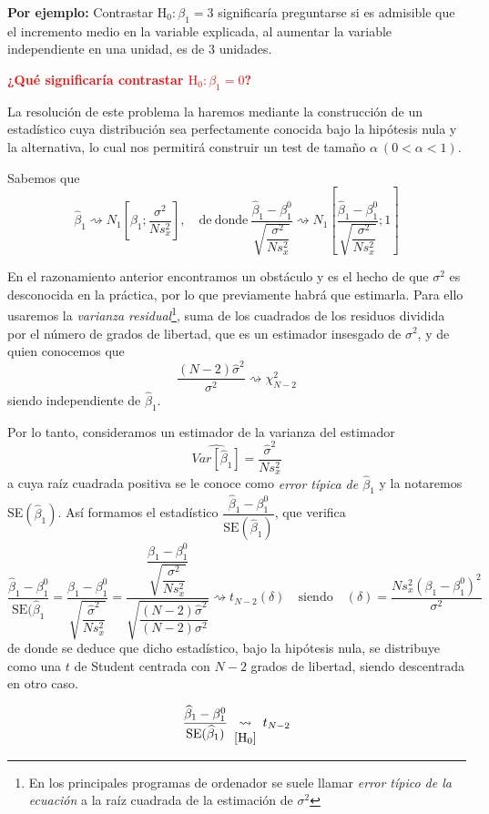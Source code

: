 \documentclass[10pt,a4paper]{book}
\begin{document}
\textbf{Por ejemplo:} Contrastar $\mathrm{H_0}:\beta_1=3$ significaría preguntarse si es admisible que el incremento medio en la variable explicada, al aumentar la variable independiente en una unidad, es de 3 unidades.

\textbf{\textcolor{red}{¿Qué significaría contrastar $\mathrm{H_0}:\beta_1=0$?}}

La resolución de este problema la haremos mediante la construcción de un estadístico cuya distribución sea perfectamente conocida bajo la hipótesis nula y la alternativa, lo cual nos permitirá construir un test de tamaño $\alpha\ (0<\alpha <1)$.

Sabemos que $$\widehat{\beta}_1\rightsquigarrow N_1 \left[\beta_1;\dfrac{\sigma^2}{Ns^2_x}\right],\quad \mathrm{de\ donde\ }\frac{\widehat{\beta}_1-\beta^0_1}{\sqrt{\dfrac{\sigma^2}{Ns^2_x}}}\rightsquigarrow N_1\left[\frac{\widehat{\beta}_1-\beta^0_1}{\sqrt{\dfrac{\sigma^2}{Ns^2_x}}};1\right]$$

En el razonamiento anterior encontramos un obstáculo y es el hecho de que $\sigma^2$ es desconocida en la práctica, por lo que previamente habrá que estimarla. Para ello usaremos la \textit{varianza residual}\footnote{ En los principales programas de ordenador se suele llamar \textit{error típico de la ecuación} a la raíz cuadrada de la estimación de $\sigma^2$}, suma de los cuadrados de los residuos dividida por el número de grados de libertad, que es un estimador insesgado de $\sigma^2$, y de quien conocemos que $$\dfrac{(N-2)\widehat{\sigma}^2}{\sigma^2}\rightsquigarrow \chi^2_{N-2}$$ siendo independiente de $\widehat{\beta}_1$.

Por lo tanto, consideramos un estimador de la varianza del estimador $$\widehat{Var[\widehat{\beta}_1]}=\dfrac{\widehat{\sigma}^2}{Ns^2_x}$$ a cuya raíz cuadrada positiva se le conoce como \textit{error típica de $\widehat{\beta}_1$} y la notaremos SE$(\widehat{\beta}_1)$. Así formamos el estadístico $\dfrac{\widehat{\beta}_1-\beta^0_1}{\mathrm{SE}(\widehat{\beta}_1)}$, que verifica
$$\dfrac{\widehat{\beta}_1-\beta^0_1}{\mathrm{SE}(\widehat{\beta}_1}=\dfrac{\widehat{\beta}_1-\beta^0_1}{\sqrt{\dfrac{\widehat{\sigma}^2}{Ns^2_x}}}=\dfrac{\dfrac{\widehat{\beta}_1-\beta^0_1}{\sqrt{\dfrac{\sigma^2}{Ns^2_x}}}}{\sqrt{\dfrac{(N-2)\widehat{\sigma}^2}{(N-2)\sigma^2}}}\rightsquigarrow t_{N-2}(\delta)\quad \mathrm{siendo}\quad (\delta)=\dfrac{Ns^2_x(\beta_1-\beta^0_1)^2}{\sigma^2}$$
de donde se deduce que dicho estadístico, bajo la hipótesis nula, se distribuye como una $t$ de Student centrada con $N-2$ grados de libertad, siendo descentrada en otro caso.
$$\dfrac{\widehat{\beta}_1-\beta^0_1}{\mathrm{SE}(\widehat{\beta}_1)}\begin{array}{c}
 \\
\rightsquigarrow \\ 
\protect [\mathrm{H}_0]
\end{array} t_{N-2}$$
\end{document}
